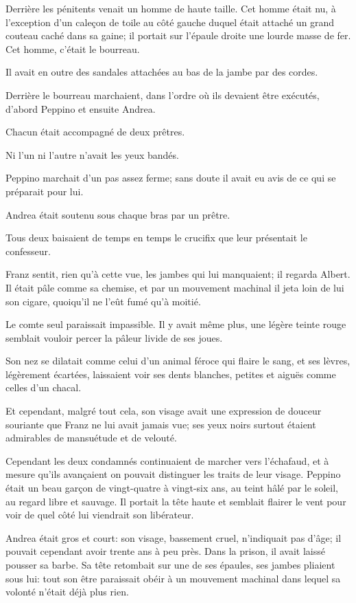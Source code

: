 Derrière les pénitents venait un homme de haute taille. Cet homme était nu, à l'exception d'un caleçon de toile au côté gauche duquel était attaché un grand couteau caché dans sa gaine; il portait sur l'épaule droite une lourde masse de fer. Cet homme, c'était le bourreau. 

Il avait en outre des sandales attachées au bas de la jambe par des cordes. 

Derrière le bourreau marchaient, dans l'ordre où ils devaient être exécutés, d'abord Peppino et ensuite Andrea. 

Chacun était accompagné de deux prêtres. 

Ni l'un ni l'autre n'avait les yeux bandés. 

Peppino marchait d'un pas assez ferme; sans doute il avait eu avis de ce qui se préparait pour lui. 

Andrea était soutenu sous chaque bras par un prêtre. 

Tous deux baisaient de temps en temps le crucifix que leur présentait le confesseur. 

Franz sentit, rien qu'à cette vue, les jambes qui lui manquaient; il regarda Albert. Il était pâle comme sa chemise, et par un mouvement machinal il jeta loin de lui son cigare, quoiqu'il ne l'eût fumé qu'à moitié. 

Le comte seul paraissait impassible. Il y avait même plus, une légère teinte rouge semblait vouloir percer la pâleur livide de ses joues. 

Son nez se dilatait comme celui d'un animal féroce qui flaire le sang, et ses lèvres, légèrement écartées, laissaient voir ses dents blanches, petites et aiguës comme celles d'un chacal. 

Et cependant, malgré tout cela, son visage avait une expression de douceur souriante que Franz ne lui avait jamais vue; ses yeux noirs surtout étaient admirables de mansuétude et de velouté. 

Cependant les deux condamnés continuaient de marcher vers l'échafaud, et à mesure qu'ils avançaient on pouvait distinguer les traits de leur visage. Peppino était un beau garçon de vingt-quatre à vingt-six ans, au teint hâlé par le soleil, au regard libre et sauvage. Il portait la tête haute et semblait flairer le vent pour voir de quel côté lui viendrait son libérateur. 

Andrea était gros et court: son visage, bassement cruel, n'indiquait pas d'âge; il pouvait cependant avoir trente ans à peu près. Dans la prison, il avait laissé pousser sa barbe. Sa tête retombait sur une de ses épaules, ses jambes pliaient sous lui: tout son être paraissait obéir à un mouvement machinal dans lequel sa volonté n'était déjà plus rien.  

